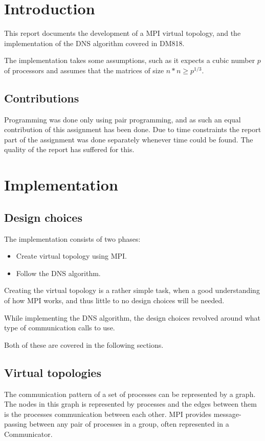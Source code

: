 \documentclass[a4paper,11pt,oneside]{book}
\begin{document}
\pagestyle{ruled}
\chapter{Introduction}
\setcounter{section}{1}
This report documents the development of a MPI virtual topology, and the implementation of the DNS algorithm covered in DM818.

The implementation takes some assumptions, such as it expects a cubic number $p$ of processors and assumes that the matrices of size $n*n \geq p^{1/3}$.

\section{Contributions}
Programming was done only using pair programming, and as such an equal contribution of this assignment has been done. Due to time constraints the report part of the assignment was done separately whenever time could be found. The quality of the report has suffered for this.

\chapter{Implementation}
\section{Design choices}
The implementation consists of two phases:
\begin{itemize}
\item Create virtual topology using MPI.
\item Follow the DNS algorithm.
\end{itemize}

Creating the virtual topology is a rather simple task, when a good understanding of how MPI works, and thus little to no design choices will be needed. 

While implementing the DNS algorithm, the design choices revolved around what type of communication calls to use.

Both of these are covered in the following sections.

\section{Virtual topologies}
The communication pattern of a set of processes can be represented by a graph. The nodes in this graph is represented by processes and the edges between them is the processes communication between each other. MPI provides message-passing between any pair of processes in a group, often represented in a Communicator.
\end{document}
